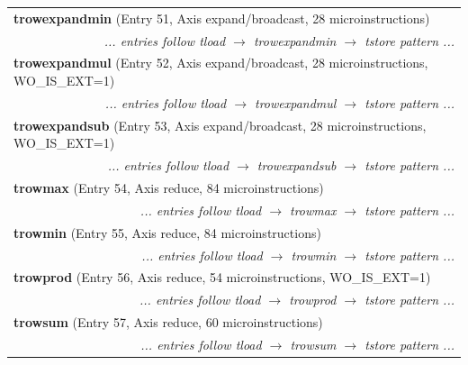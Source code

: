 \begin{longtable}{r r r r r r r r}
\multicolumn{8}{l}{\textbf{trowexpandmin} (Entry 51, Axis expand/broadcast, 28 microinstructions)} \\
  & \multicolumn{7}{r}{\textit{... entries follow tload $\rightarrow$ trowexpandmin $\rightarrow$ tstore pattern ...}} \\

\multicolumn{8}{l}{\textbf{trowexpandmul} (Entry 52, Axis expand/broadcast, 28 microinstructions, WO\_IS\_EXT=1)} \\
  & \multicolumn{7}{r}{\textit{... entries follow tload $\rightarrow$ trowexpandmul $\rightarrow$ tstore pattern ...}} \\

\multicolumn{8}{l}{\textbf{trowexpandsub} (Entry 53, Axis expand/broadcast, 28 microinstructions, WO\_IS\_EXT=1)} \\
  & \multicolumn{7}{r}{\textit{... entries follow tload $\rightarrow$ trowexpandsub $\rightarrow$ tstore pattern ...}} \\

\multicolumn{8}{l}{\textbf{trowmax} (Entry 54, Axis reduce, 84 microinstructions)} \\
  & \multicolumn{7}{r}{\textit{... entries follow tload $\rightarrow$ trowmax $\rightarrow$ tstore pattern ...}} \\

\multicolumn{8}{l}{\textbf{trowmin} (Entry 55, Axis reduce, 84 microinstructions)} \\
  & \multicolumn{7}{r}{\textit{... entries follow tload $\rightarrow$ trowmin $\rightarrow$ tstore pattern ...}} \\

\multicolumn{8}{l}{\textbf{trowprod} (Entry 56, Axis reduce, 54 microinstructions, WO\_IS\_EXT=1)} \\
  & \multicolumn{7}{r}{\textit{... entries follow tload $\rightarrow$ trowprod $\rightarrow$ tstore pattern ...}} \\

\multicolumn{8}{l}{\textbf{trowsum} (Entry 57, Axis reduce, 60 microinstructions)} \\
  & \multicolumn{7}{r}{\textit{... entries follow tload $\rightarrow$ trowsum $\rightarrow$ tstore pattern ...}} \\


\end{longtable}
